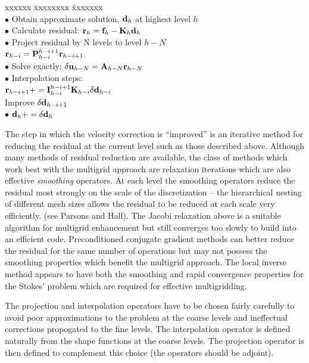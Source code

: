 \documentclass[10pt]{article}
\begin{document}
		\begin{tabbing}
			  xxxxxx \= xxxxxxxx \= xxxxxxx \kill  \\ 
			  $\bullet$ Obtain approximate solution, ${\bf d}_h$ at highest level $h$\\
			  $\bullet$ Calculate residual: ${\bf r}_h = {\bf f}_h - {\bf K}_h {\bf d}_h$\\
			  $\bullet$ Project residual by N levels to level $h-N$\\
			  \> ${\bf r}_{h-i} = {\bf  P}_{h-i}^{h-i+1} {\bf r}_{h-i+1}$\\
			  $\bullet$ Solve exactly: $\delta {\bf u}_{h-N} = {\bf A}_{h-N} {\bf r}_{h-N}$\\
			  $\bullet$ Interpolation steps:\\
			  \> ${\bf r}_{h-i+1} += {\bf I}_{h-i}^{h-i+1} {\bf K}_{h-i} \delta {\bf d}_{h-i} $\\
			  \> Improve $\delta {\bf d}_{h-i+1}$ \\
			  $\bullet$ ${\bf d}_h += \delta {\bf d}_h$\\
		\end{tabbing}
	
	The step in which the velocity correction is ``improved'' is an iterative
	method for reducing the residual at the current level such as those described
	above. Although many methods of residual reduction are available, the class
	of methods which work best with the multigrid approach are relaxation iterations
	which are also effective {\sl smoothing} operators. At each level the smoothing
	operators reduce the residual most strongly on the scale  of the discretization --
	the hierarchical nesting of different mesh sizes allows the residual to be reduced
	at each scale very efficiently. (see Parsons and Hall).  The Jacobi relaxation
	above is a suitable algorithm for multigrid enhancement but still converges too
	slowly to build into an efficient code. Preconditioned conjugate gradient
	methods can better reduce the residual for the same number of operations
	but may not possess the smoothing properties which benefit the multigrid
	approach. The local inverse method appears to have both the smoothing and 
	rapid convergence properties for the Stokes' problem which are required for
	effective multigridding.
	
	The projection and interpolation operators have to be chosen fairly carefully
	to avoid poor approximations to the problem at the coarse levels and ineffectual
	corrections propogated to the fine levels. The interpolation operator is defined 
	naturally from the shape functions at the coarse levels. The projection operator
	is then defined to complement this choice (the operators should be adjoint).
	
\end{document}
